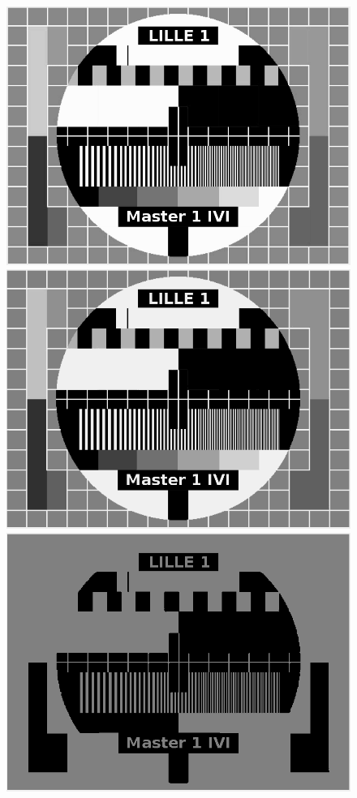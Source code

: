 \documentclass[a4paper,12pt]{report}
\begin{document}
\begin{figure}[!ht]
	\center
	\includegraphics[scale=0.3]{image/p321.png}
	\includegraphics[scale=0.3]{image/p322.png}
	\includegraphics[scale=0.3]{image/p323.png}
\end{figure}
\end{document}
